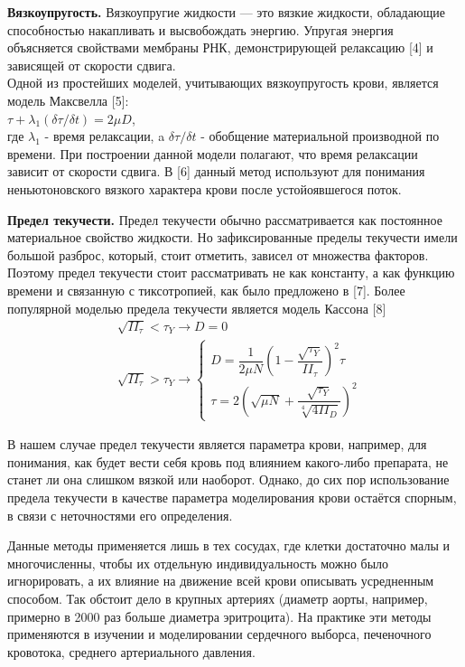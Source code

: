 \textbf{Вязкоупругость.}
Вязкоупругие жидкости — это вязкие жидкости, обладающие способностью накапливать и высвобождать энергию. Упругая энергия объясняется свойствами мембраны РНК, демонстрирующей релаксацию [4] и зависящей от скорости сдвига.\\
Одной из простейших моделей, учитывающих вязкоупругость крови, является модель Максвелла [5]:\\
$\tau+\lambda_1(\delta\tau / \delta t)=2\mu D$,\\  где 
$\lambda_1$ 
- время релаксации, a 
$\delta\tau / \delta t$
- обобщение материальной производной по времени.
При построении данной модели полагают, что время релаксации зависит от скорости сдвига.
В [6] данный метод используют для понимания неньютоновского вязкого характера крови после устойоявшегося поток.

\textbf{Предел текучести.}
Предел текучести обычно рассматривается как постоянное материальное свойство жидкости. Но зафиксированные пределы текучести имели большой разброс, который, стоит отметить, зависел от множества факторов.
Поэтому предел текучести стоит рассматривать не как константу, а как функцию времени и связанную с тиксотропией, как было предложено в [7].
Более популярной моделью предела текучести является модель Кассона [8]
$$
\begin{aligned}
	&\sqrt{II_\tau} < \tau_Y\longrightarrow D=0 \\
	&\sqrt{II_\tau} > \tau_Y\longrightarrow
	\begin{cases}
		D   = \dfrac{1}{2\mu N}(1-\dfrac{\sqrt{\tau_Y}}{II_\tau})^2\tau \\[10pt]
		\tau= 2(\sqrt{\mu N}+\dfrac{\sqrt{\tau_Y}}{\sqrt[4]{4II_D}})^2
	\end{cases}
\end{aligned}
$$

В нашем случае предел текучести является параметра крови, например, для понимания, как будет вести себя кровь под влиянием какого-либо препарата, не станет ли она слишком вязкой или наоборот.
Однако, до сих пор использование предела текучести в качестве параметра моделирования крови остаётся спорным, в связи с неточностями его определения.

Данные методы применяется лишь в тех сосудах, где клетки достаточно малы и 
многочисленны, чтобы их отдельную индивидуальность можно было игнорировать, а их влияние на движение всей крови описывать усредненным способом. Так обстоит дело в крупных артериях (диаметр аорты, например, примерно в 2000 раз больше диаметра эритроцита). 
На практике эти методы применяются в изучении и моделировании сердечного выборса, печеночного кровотока, среднего артериального давления.

